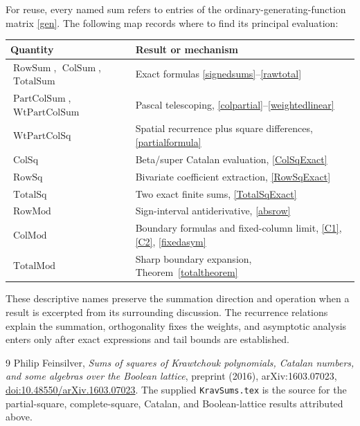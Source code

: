 \documentclass[11pt,reqno]{amsart}
\theoremstyle{remark}\newtheorem{remark}[theorem]{Remark}
\DeclareMathOperator{\RowSum}{RowSum}
\DeclareMathOperator{\ColSum}{ColSum}
\DeclareMathOperator{\TotalSum}{TotalSum}
\DeclareMathOperator{\RowSq}{RowSq}
\DeclareMathOperator{\ColSq}{ColSq}
\DeclareMathOperator{\TotalSq}{TotalSq}
\DeclareMathOperator{\RowMod}{RowMod}
\DeclareMathOperator{\ColMod}{ColMod}
\DeclareMathOperator{\TotalMod}{TotalMod}
\DeclareMathOperator{\PartColSum}{PartColSum}
\DeclareMathOperator{\WtPartColSum}{WtPartColSum}
\DeclareMathOperator{\WtPartColSq}{WtPartColSq}
\begin{document}
For reuse, every named sum refers to entries of the ordinary-generating-function matrix \eqref{gen}. The following map records where to find its principal evaluation:
\begin{center}\small
\begin{tabular}{ll}
\textbf{Quantity}&\textbf{Result or mechanism}\\\hline
$\RowSum$, $\ColSum$, $\TotalSum$&Exact formulas \eqref{signedsums}--\eqref{rawtotal}\\
$\PartColSum$, $\WtPartColSum$&Pascal telescoping, \eqref{colpartial}--\eqref{weightedlinear}\\
$\WtPartColSq$&Spatial recurrence plus square differences, \eqref{partialformula}\\
$\ColSq$&Beta/super Catalan evaluation, \eqref{ColSqExact}\\
$\RowSq$&Bivariate coefficient extraction, \eqref{RowSqExact}\\
$\TotalSq$&Two exact finite sums, \eqref{TotalSqExact}\\
$\RowMod$&Sign-interval antiderivative, \eqref{absrow}\\
$\ColMod$&Boundary formulas and fixed-column limit, \eqref{C1}, \eqref{C2}, \eqref{fixedasym}\\
$\TotalMod$&Sharp boundary expansion, Theorem~\ref{totaltheorem}
\end{tabular}
\end{center}
These descriptive names preserve the summation direction and operation when a result is excerpted from its surrounding discussion. The recurrence relations explain the summation, orthogonality fixes the weights, and asymptotic analysis enters only after exact expressions and tail bounds are established.

\begin{thebibliography}{9}
Philip Feinsilver, \emph{Sums of squares of Krawtchouk polynomials, Catalan numbers, and some algebras over the Boolean lattice}, preprint (2016), arXiv:1603.07023, \href{https://doi.org/10.48550/arXiv.1603.07023}{doi:10.48550/arXiv.1603.07023}. The supplied \texttt{KravSums.tex} is the source for the partial-square, complete-square, Catalan, and Boolean-lattice results attributed above.
\end{thebibliography}
\end{document}
